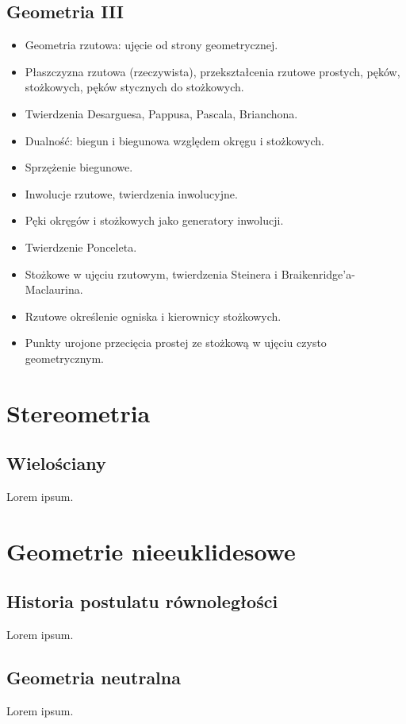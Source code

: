 \documentclass{LegrandOrangeBook}
\begin{document}
\chapter{Geometria III}
\begin{itemize}
	\item Geometria rzutowa: ujęcie od strony geometrycznej.
	\item Płaszczyzna rzutowa (rzeczywista), przekształcenia rzutowe prostych, pęków, stożkowych, pęków stycznych do stożkowych.
	\item Twierdzenia Desarguesa, Pappusa, Pascala, Brianchona.
	\item Dualność: biegun i biegunowa względem okręgu i stożkowych.
	\item Sprzężenie biegunowe.
	\item Inwolucje rzutowe, twierdzenia inwolucyjne.
	\item Pęki okręgów i stożkowych jako generatory inwolucji.
	\item Twierdzenie Ponceleta.
	\item Stożkowe w ujęciu rzutowym, twierdzenia Steinera i Braikenridge'a-Maclaurina.
	\item Rzutowe określenie ogniska i kierownicy stożkowych.
	\item Punkty urojone przecięcia prostej ze stożkową w ujęciu czysto geometrycznym.
\end{itemize}










\part{Stereometria}
\chapter{Wielościany}
Lorem ipsum.

\part{Geometrie nieeuklidesowe}
\chapter{Historia postulatu równoległości}
Lorem ipsum.

\chapter{Geometria neutralna}
Lorem ipsum.
\end{document}
